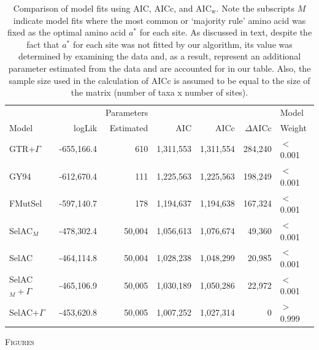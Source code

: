 \documentclass[12pt,letterpaper,fleqn]{article}
\renewcommand{\section}[1]{%
\bigskip
\begin{center}
\begin{Large}
\normalfont\scshape #1
\medskip
\end{Large}
\end{center}}
\newcommand{\DeltaAICc}{\ensuremath{\Delta\text{AICc}}\xspace}
\newcommand{\AICw}{\ensuremath{\text{AIC}_\text{w}}\xspace}
\newcommand{\selac}{SelAC\xspace}
\newcommand{\selacplusgamma}{SelAC$+\Gamma$\xspace}
\newcommand{\selacmaj}{SelAC$_{M}$\xspace}
\newcommand{\selacmajplusgamma}{SelAC$_{M}+\Gamma$\xspace}
\newcommand{\aopt}{\ensuremath{a^*}\xspace}
\begin{document}
  \begin{table}[H]
    \begin{tabular}{lrrrrrl}
                                &                  &Parameters &              &              &            &    Model\\
      Model                     & logLik   & Estimated &           AIC&          AICc&  \DeltaAICc&  Weight\\\hline
      GTR+$\Gamma$              & -655,166.4&       610&      1,311,553&     1,311,554&     284,240&        $<$0.001\\
      GY94                      & -612,670.4&       111&      1,225,563&     1,225,563&     198,249&           $<$0.001\\
      FMutSel                   & -597,140.7&       178&      1,194,637&     1,194,638&     167,324&           $<$0.001\\
      \selacmaj                 & -478,302.4&       50,004&   1,056,613&     1,076,674&      49,360&          $<$0.001\\
      \selac                    & -464,114.8&       50,004&   1,028,238&     1,048,299&      20,985&          $<$0.001\\
      \selacmajplusgamma        & -465,106.9&       50,005&   1,030,189&     1,050,286&      22,972&          $<$0.001\\
      \selacplusgamma           & -453,620.8&       50,005&   1,007,252&     1,027,314&           0&          $>$0.999\\
    \end{tabular}
    \caption{Comparison of model fits using AIC, AICc, and \AICw.
Note the subscripts $M$ indicate model fits where the most common or `majority rule' amino acid was fixed as the optimal amino acid \aopt for each site.
As discussed in text, despite the fact that \aopt for each site was not fitted by our algorithm, its value was determined by examining the data and, as a result, represent an additional parameter estimated from the data and are accounted for in our table.
Also, the sample size used in the calculation of AICc is assumed to be equal to the size of the matrix (number of taxa x number of sites).
}
    \label{table:modelFits}
\end{table}



\clearpage %

\section{Figures}
\end{document}
